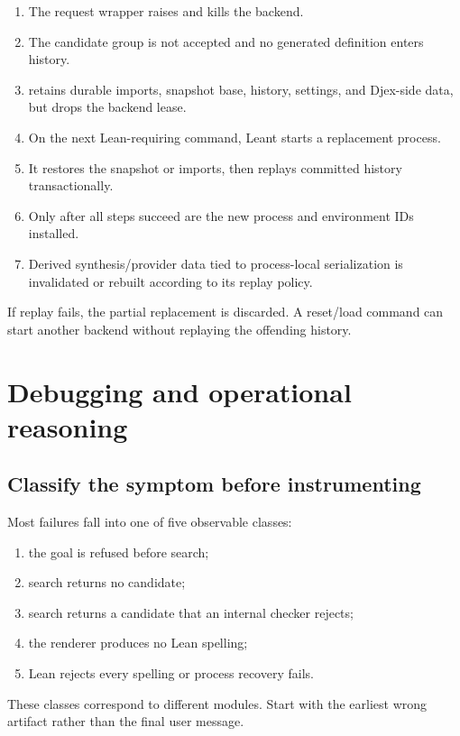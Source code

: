 \documentclass[10pt,letterpaper,oneside]{report}
\newcommand{\code}[1]{\texttt{\detokenize{#1}}}
\begin{document}
\begin{enumerate}
  \item The request wrapper raises \code{RequestTimeout} and kills the backend.
  \item The candidate group is not accepted and no generated definition enters history.
  \item \code{ReplState} retains durable imports, snapshot base, history, settings, and Djex-side data, but drops the backend lease.
  \item On the next Lean-requiring command, Leant starts a replacement process.
  \item It restores the snapshot or imports, then replays committed history transactionally.
  \item Only after all steps succeed are the new process and environment IDs installed.
  \item Derived synthesis/provider data tied to process-local serialization is invalidated or rebuilt according to its replay policy.
\end{enumerate}

If replay fails, the partial replacement is discarded. A reset/load command can start another backend without replaying the offending history.

\chapter{Debugging and operational reasoning}\label{ch:debugging}

\section{Classify the symptom before instrumenting}

Most failures fall into one of five observable classes:

\begin{enumerate}
  \item the goal is refused before search;
  \item search returns no candidate;
  \item search returns a candidate that an internal checker rejects;
  \item the renderer produces no Lean spelling;
  \item Lean rejects every spelling or process recovery fails.
\end{enumerate}

These classes correspond to different modules. Start with the earliest wrong artifact rather than the final user message.
\end{document}

